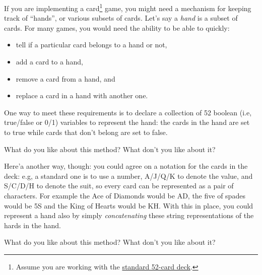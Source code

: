\documentclass[
  letterpaper,
  DIV=11,
  numbers=noendperiod]{scrreprt}
\providecommand{\tightlist}{%
  \setlength{\itemsep}{0pt}\setlength{\parskip}{0pt}}\usepackage{longtable,booktabs,array}
\begin{document}
If you are implementing a card\footnote{Assume you are working with the
  \href{https://en.wikipedia.org/wiki/Standard_52-card_deck}{standard
  52-card deck}.} game, you might need a mechanism for keeping track of
``hands'', or various subsets of cards. Let's say a \emph{hand} is a
subset of cards. For many games, you would need the ability to be able
to quickly:

\begin{itemize}
\tightlist
\item
  tell if a particular card belongs to a hand or not,
\item
  add a card to a hand,
\item
  remove a card from a hand, and
\item
  replace a card in a hand with another one.
\end{itemize}

One way to meet these requirements is to declare a collection of 52
boolean (i.e, true/false or 0/1) variables to represent the hand: the
cards in the hand are set to true while cards that don't belong are set
to false.

\begin{tcolorbox}[standard jigsaw,toptitle=1mm, titlerule=0mm, bottomtitle=1mm, title=\textcolor{quarto-callout-caution-color}{\faFire}\hspace{0.5em}{Food for thought.}, coltitle=black, colback=white, toprule=.15mm, colframe=quarto-callout-caution-color-frame, arc=.35mm, rightrule=.15mm, opacityback=0, left=2mm, leftrule=.75mm, colbacktitle=quarto-callout-caution-color!10!white, opacitybacktitle=0.6, bottomrule=.15mm]
What do you like about this method? What don't you like about it?
\end{tcolorbox}

Here'a another way, though: you could agree on a notation for the cards
in the deck: e.g, a standard one is to use a number, A/J/Q/K to denote
the value, and S/C/D/H to denote the suit, so every card can be
represented as a pair of characters. For example the Ace of Diamonds
would be AD, the five of spades would be 5S and the King of Hearts would
be KH. With this in place, you could represent a hand also by simply
\emph{concatenating} these string representations of the hards in the
hand.

\begin{tcolorbox}[standard jigsaw,toptitle=1mm, titlerule=0mm, bottomtitle=1mm, title=\textcolor{quarto-callout-caution-color}{\faFire}\hspace{0.5em}{Food for thought.}, coltitle=black, colback=white, toprule=.15mm, colframe=quarto-callout-caution-color-frame, arc=.35mm, rightrule=.15mm, opacityback=0, left=2mm, leftrule=.75mm, colbacktitle=quarto-callout-caution-color!10!white, opacitybacktitle=0.6, bottomrule=.15mm]
What do you like about this method? What don't you like about it?
\end{tcolorbox}
\end{document}
